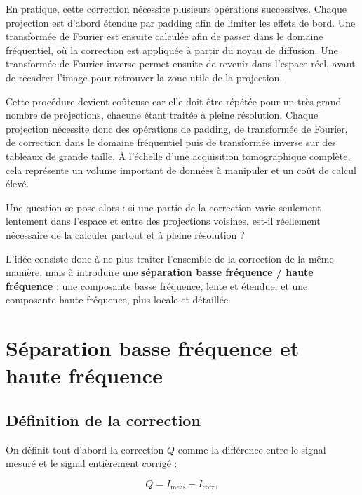 \documentclass[11pt,a4paper]{report}
\begin{document}
En pratique, cette correction nécessite plusieurs opérations successives.
Chaque projection est d'abord étendue par padding afin de limiter les
effets de bord. Une transformée de Fourier est ensuite calculée afin de
passer dans le domaine fréquentiel, où la correction est appliquée à partir
du noyau de diffusion. Une transformée de Fourier inverse permet ensuite de
revenir dans l'espace réel, avant de recadrer l'image pour retrouver la
zone utile de la projection.

Cette procédure devient coûteuse car elle doit être répétée pour un très
grand nombre de projections, chacune étant traitée à pleine résolution.
Chaque projection nécessite donc des opérations de padding, de transformée
de Fourier, de correction dans le domaine fréquentiel puis de transformée
inverse sur des tableaux de grande taille. À l'échelle d'une acquisition
tomographique complète, cela représente un volume important de données à
manipuler et un coût de calcul élevé.

Une question se pose alors : si une partie de la correction varie seulement
lentement dans l'espace et entre des projections voisines, est-il réellement
nécessaire de la calculer partout et à pleine résolution ?

\vspace{0.8em}

L'idée consiste donc à ne plus traiter l'ensemble de la correction de la
même manière, mais à introduire une
\textbf{\textcolor{ESRFblue}{séparation basse fréquence / haute fréquence}} :
une composante basse fréquence, lente et étendue, et une composante haute
fréquence, plus locale et détaillée.



\chapter{Séparation basse fréquence et haute fréquence}

\section{Définition de la correction}

On définit tout d'abord la correction $Q$ comme la différence entre le
signal mesuré et le signal entièrement corrigé :

\begin{equation}
Q
=
I_{\mathrm{meas}}
-
I_{\mathrm{corr}},
\end{equation}
\end{document}

